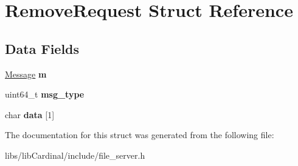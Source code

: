 \hypertarget{structRemoveRequest}{}\section{Remove\+Request Struct Reference}
\label{structRemoveRequest}
\subsection*{Data Fields}
\begin{DoxyCompactItemize}
\item 
\hyperlink{structMessage}{Message} {\bfseries m}\hypertarget{structRemoveRequest_ab276390706ce9db2d2ff9c945371ca0f}{}\label{structRemoveRequest_ab276390706ce9db2d2ff9c945371ca0f}

\item 
uint64\+\_\+t {\bfseries msg\+\_\+type}\hypertarget{structRemoveRequest_a85960728788df44e33871526b416b0ea}{}\label{structRemoveRequest_a85960728788df44e33871526b416b0ea}

\item 
char {\bfseries data} \mbox{[}1\mbox{]}\hypertarget{structRemoveRequest_a46ba296a355a825e9f092d14d9437808}{}\label{structRemoveRequest_a46ba296a355a825e9f092d14d9437808}

\end{DoxyCompactItemize}


The documentation for this struct was generated from the following file\+:\begin{DoxyCompactItemize}
\item 
libs/lib\+Cardinal/include/file\+\_\+server.\+h\end{DoxyCompactItemize}
